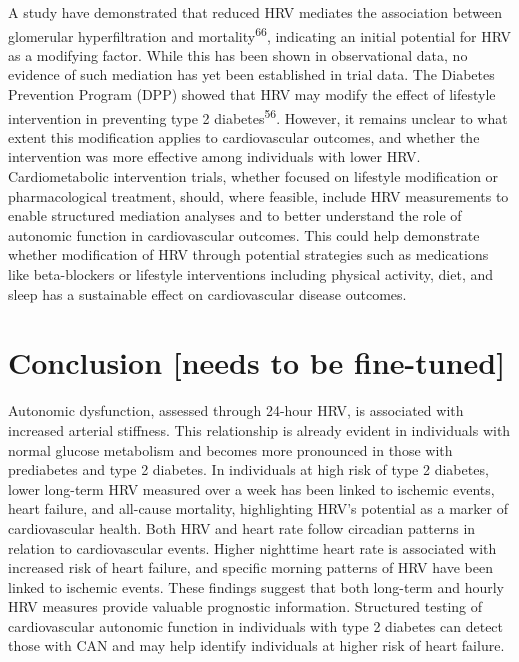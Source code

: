 \documentclass[
  a4paper,
  headsepline=true,
  open=any]{scrbook}
\begin{document}
A study have demonstrated that reduced HRV mediates the association
between glomerular hyperfiltration and mortality\textsuperscript{66},
indicating an initial potential for HRV as a modifying factor. While
this has been shown in observational data, no evidence of such mediation
has yet been established in trial data. The Diabetes Prevention Program
(DPP) showed that HRV may modify the effect of lifestyle intervention in
preventing type 2 diabetes\textsuperscript{56}. However, it remains
unclear to what extent this modification applies to cardiovascular
outcomes, and whether the intervention was more effective among
individuals with lower HRV. Cardiometabolic intervention trials, whether
focused on lifestyle modification or pharmacological treatment, should,
where feasible, include HRV measurements to enable structured mediation
analyses and to better understand the role of autonomic function in
cardiovascular outcomes. This could help demonstrate whether
modification of HRV through potential strategies such as medications
like beta-blockers or lifestyle interventions including physical
activity, diet, and sleep has a sustainable effect on cardiovascular
disease outcomes.


\hypertarget{conclusion-needs-to-be-fine-tuned}{%
\chapter{Conclusion {[}needs to be
fine-tuned{]}}\label{conclusion-needs-to-be-fine-tuned}}

Autonomic dysfunction, assessed through 24-hour HRV, is associated with
increased arterial stiffness. This relationship is already evident in
individuals with normal glucose metabolism and becomes more pronounced
in those with prediabetes and type 2 diabetes. In individuals at high
risk of type 2 diabetes, lower long-term HRV measured over a week has
been linked to ischemic events, heart failure, and all-cause mortality,
highlighting HRV's potential as a marker of cardiovascular health. Both
HRV and heart rate follow circadian patterns in relation to
cardiovascular events. Higher nighttime heart rate is associated with
increased risk of heart failure, and specific morning patterns of HRV
have been linked to ischemic events. These findings suggest that both
long-term and hourly HRV measures provide valuable prognostic
information. Structured testing of cardiovascular autonomic function in
individuals with type 2 diabetes can detect those with CAN and may help
identify individuals at higher risk of heart failure.
\end{document}
